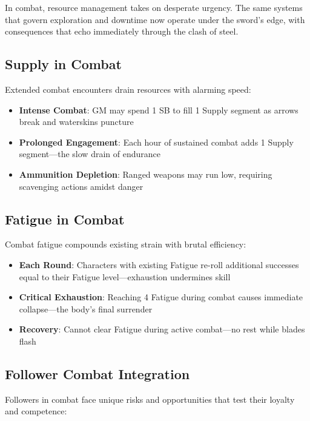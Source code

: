 In combat, resource management takes on desperate urgency. The same systems that govern exploration and downtime now operate under the sword's edge, with consequences that echo immediately through the clash of steel.

\subsection*{Supply in Combat}

Extended combat encounters drain resources with alarming speed:

\begin{itemize}
    \item \textbf{Intense Combat}: GM may spend 1 SB to fill 1 Supply segment as arrows break and waterskins puncture
    \item \textbf{Prolonged Engagement}: Each hour of sustained combat adds 1 Supply segment—the slow drain of endurance
    \item \textbf{Ammunition Depletion}: Ranged weapons may run low, requiring scavenging actions amidst danger
\end{itemize}

\subsection*{Fatigue in Combat}

Combat fatigue compounds existing strain with brutal efficiency:

\begin{itemize}
    \item \textbf{Each Round}: Characters with existing Fatigue re-roll additional successes equal to their Fatigue level—exhaustion undermines skill
    \item \textbf{Critical Exhaustion}: Reaching 4 Fatigue during combat causes immediate collapse—the body's final surrender
    \item \textbf{Recovery}: Cannot clear Fatigue during active combat—no rest while blades flash
\end{itemize}

\subsection*{Follower Combat Integration}

Followers in combat face unique risks and opportunities that test their loyalty and competence:

